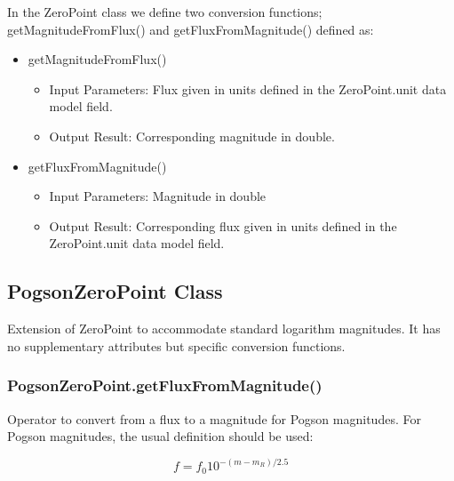 \documentclass[11pt,a4paper]{ivoa}
\begin{document}
In the ZeroPoint class we define two conversion functions; 
getMagnitudeFromFlux() and getFluxFromMagnitude() defined as:\par

\begin{itemize}
	\item getMagnitudeFromFlux()\par

\begin{itemize}
	\item{Input Parameters: Flux given in units defined in the 
	ZeroPoint.unit data model field.\par}

	\item{Output Result: Corresponding magnitude in double.\par}


\vspace{\baselineskip}

\end{itemize}
	\item  getFluxFromMagnitude()\par

\begin{itemize}
	\item{Input Parameters: Magnitude in double\par}

	\item{Output Result: Corresponding flux given in units defined in 
	the ZeroPoint.unit data model field.}
\end{itemize}
\end{itemize}
\par


\subsection{PogsonZeroPoint Class}
Extension of ZeroPoint to accommodate standard logarithm magnitudes. It 
has no supplementary attributes but specific conversion functions.
\par

\subsubsection{PogsonZeroPoint.getFluxFromMagnitude()}
Operator to convert from a flux to a magnitude for Pogson magnitudes. For 
Pogson magnitudes, the usual definition should be used:
\par
\begin{equation} \label{eq:25}
f = f_0 10^{-(m-m_R)/2.5}
\end{equation}
\end{document}

